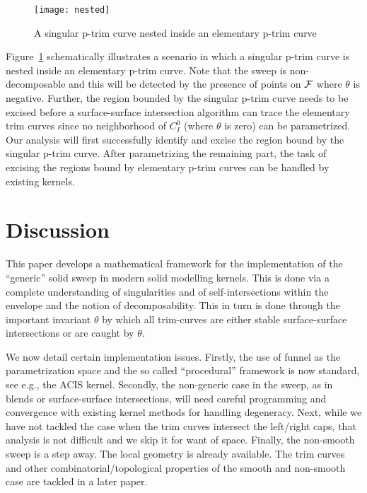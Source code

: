 \documentclass{elsart5p}
\begin{document}
\begin{figure}
 \centering
 \texttt{[image: nested]}
 \caption{A singular p-trim curve nested inside an elementary p-trim curve}\label{nestedFig}
\end{figure}

Figure~\ref{nestedFig} schematically illustrates a scenario in which a singular p-trim curve is nested 
inside an elementary p-trim curve.  Note that the sweep is non-decomposable and this will be detected 
by the presence of points on ${\cal F}$ where $\theta$ is negative.  Further, the region bounded by the 
singular p-trim curve needs to be excised before a surface-surface intersection algorithm can trace the 
elementary trim curves since no neighborhood of $C_I^0$ (where $\theta$ is zero) can be parametrized. 
Our analysis will first successfully identify and excise the region bound by the singular p-trim curve.  
After parametrizing the remaining part, 
the task of excising the regions bound by elementary p-trim curves can be handled by existing kernels.

\section{Discussion} \label{conclusionSec}

This paper develops a mathematical framework for the implementation of the
``generic'' solid sweep in modern solid modelling kernels. This is done via
a complete understanding of singularities and of self-intersections within
the envelope and the notion of decomposability. This in turn is done
through the
important invariant $\theta $ by which all trim-curves are either stable
surface-surface intersections or are caught by $\theta $.

We now detail certain implementation issues. Firstly, the use of funnel as
the parametrization space and the so called ``procedural'' framework is now
standard, see e.g., the ACIS kernel. Secondly, the non-generic case in the
sweep, as in blends or surface-surface intersections, will need careful
programming and convergence with existing kernel methods for handling
degeneracy. Next, while we have not tackled the case when the trim curves
intersect the left/right caps, that analysis is not difficult and we skip
it for want of space. Finally, the non-smooth sweep is a step away. The
local geometry is already available. The trim curves and other
combinatorial/topological properties of the smooth and non-smooth case are tackled in
a later paper.
\end{document}
